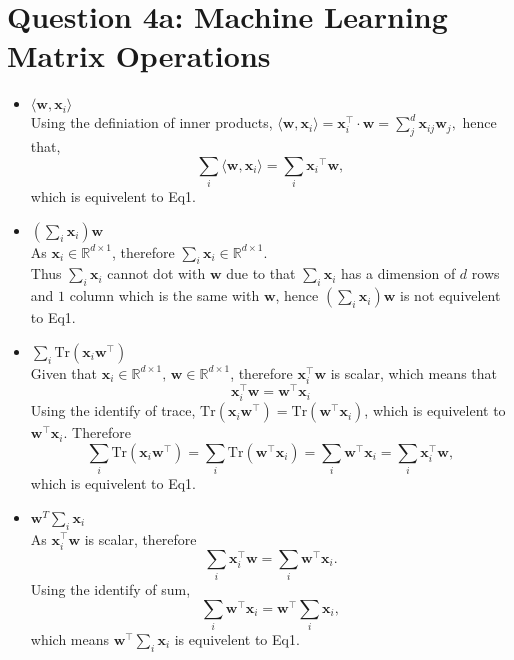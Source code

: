 \documentclass{article}
\begin{document}
\section*{Question 4a: Machine Learning Matrix Operations}

\begin{itemize}
    \item $\langle \mathbf{w}, \mathbf{x}_i \rangle$ \\
Using the definiation of inner products, 
$
\langle \mathbf{w}, \mathbf{x}_i \rangle = \mathbf{x}_i^\top \cdot \mathbf{w} = \sum_{j}^{d} \mathbf{x}_{ij} \mathbf{w}_j,
$
hence that, 
$$
\sum_i \langle \mathbf{w}, \mathbf{x}_i \rangle = \sum_i {\mathbf{x}_i}^\top \mathbf{w},
$$
which is equivelent to Eq1.
    \item $(\sum_i \mathbf{x}_i) \mathbf{w}$ \\
As $\mathbf{x}_i \in \mathbb{R}^{d \times 1}$, therefore $\sum_i \mathbf{x}_i \in \mathbb{R}^{d \times 1}$. \\
Thus $\sum_i \mathbf{x}_i$ cannot dot with $\mathbf{w}$ due to that $\sum_i \mathbf{x}_i$ has a dimension of $d$ rows and $1$ column which is the same with $\mathbf{w}$, hence $(\sum_i \mathbf{x}_i) \mathbf{w}$ is not equivelent to Eq1.
    \item $\sum_i \text{Tr}(\mathbf{x}_i \mathbf{w}^\top)$ \\
Given that $\mathbf{x}_i \in \mathbb{R}^{d \times 1}, \, \mathbf{w} \in \mathbb{R}^{d \times 1}$, therefore $\mathbf{x}_i^\top \mathbf{w}$ is scalar, which means that
$$
 \mathbf{x}_i^\top \mathbf{w} = \mathbf{w}^\top \mathbf{x}_i
$$
Using the identify of trace, $\text{Tr}(\mathbf{x}_i \mathbf{w}^\top) = \text{Tr}(\mathbf{w}^\top \mathbf{x}_i)$, which is equivelent to $\mathbf{w}^\top \mathbf{x}_i$.
Therefore 
$$\sum_i \text{Tr}(\mathbf{x}_i \mathbf{w}^\top) =\sum_i  \text{Tr}(\mathbf{w}^\top \mathbf{x}_i) = \sum_i \mathbf{w}^\top \mathbf{x}_i = \sum_i \mathbf{x}_i^\top \mathbf{w},$$ 
which is equivelent to Eq1.
    \item $\mathbf{w}^T \sum_i \mathbf{x}_i$ \\
As $\mathbf{x}_i^\top \mathbf{w}$ is scalar, therefore
$$
\sum_i \mathbf{x}_i^\top \mathbf{w} = \sum_i \mathbf{w}^\top \mathbf{x}_i.
$$
Using the identify of sum, 
$$
\sum_i \mathbf{w}^\top \mathbf{x}_i =  \mathbf{w}^\top \sum_i \mathbf{x}_i,
$$
which means $\mathbf{w}^\top \sum_i \mathbf{x}_i$ is equivelent to Eq1.
\end{itemize}
\end{document}
